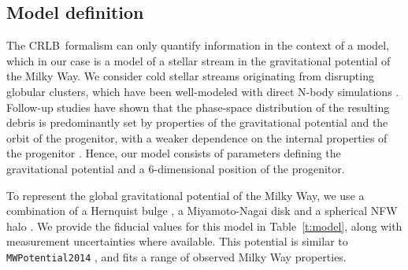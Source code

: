 \documentclass[modern]{aastex61}
\newcommand{\acronym}[1]{{\small{#1}}}
\newcommand{\CRLB}{\acronym{CRLB}}
\begin{document}
\subsection{Model definition}
\label{sec:model}
The \CRLB\ formalism can only quantify information in the context of a model, which in our case is a model of a stellar stream in the gravitational potential of the Milky Way.
We consider cold stellar streams originating from disrupting globular clusters, which have been well-modeled with direct N-body simulations \citep[e.g.,][]{baumgardt2003, dehnen2004}.
Follow-up studies have shown that the phase-space distribution of the resulting debris is predominantly set by properties of the gravitational potential and the orbit of the progenitor, with a weaker dependence on the internal properties of the progenitor \citep{kupper2010, kupper2012}.
Hence, our model consists of parameters defining the gravitational potential and a 6-dimensional position of the progenitor.

To represent the global gravitational potential of the Milky Way, we use a combination of a Hernquist bulge \citep[parameterized with mass, $M_b$, and scale radius, $a_b$]{hernquist1990}, a Miyamoto-Nagai disk \citep[with parameters for disk mass, $M_d$, scale length, $a_d$, and scale height, $b_d$]{mn} and a spherical NFW halo \citep[parameterized with scale velocity, scale radius, and axis ratios $q_x=q_z=1$]{nfw}.
We provide the fiducial values for this model in Table~\ref{t:model}, along with measurement uncertainties where available.
This potential is similar to \texttt{MWPotential2014} \citep{galpy}, and fits a range of observed Milky Way properties. %
\end{document}

